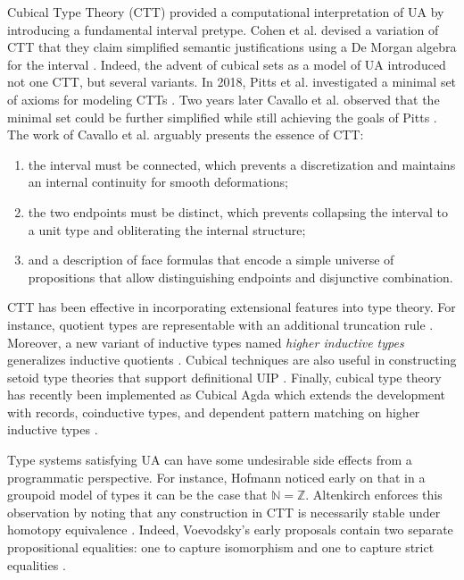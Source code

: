 Cubical Type Theory (CTT) provided a computational interpretation of UA by introducing a fundamental interval pretype.
Cohen et al. devised a variation of CTT that they claim simplified semantic justifications using a De Morgan algebra for the interval \cite{cohen2016}.
Indeed, the advent of cubical sets as a model of UA introduced not one CTT, but several variants.
In 2018, Pitts et al. investigated a minimal set of axioms for modeling CTTs \cite{pitts2018}.
Two years later Cavallo et al. observed that the minimal set could be further simplified while still achieving the goals of Pitts \cite{cavallo2020}.
The work of Cavallo et al. arguably presents the essence of CTT:
\begin{enumerate}
    \item {
        the interval must be connected, which prevents a discretization and maintains an internal continuity for smooth deformations;
    }
    \item {
        the two endpoints must be distinct, which prevents collapsing the interval to a unit type and obliterating the internal structure;
    }
    \item {
        and a description of face formulas that encode a simple universe of propositions that allow distinguishing endpoints and disjunctive combination.
    }
\end{enumerate}
CTT has been effective in incorporating extensional features into type theory.
For instance, quotient types are representable with an additional truncation rule \cite{kraus2020}.
Moreover, a new variant of inductive types named \textit{higher inductive types} generalizes inductive quotients \cite{angiuli2017}.
Cubical techniques are also useful in constructing setoid type theories that support definitional UIP \cite{sterling2020}.
Finally, cubical type theory has recently been implemented as Cubical Agda which extends the development with records, coinductive types, and dependent pattern matching on higher inductive types \cite{vezzosi2021}.

Type systems satisfying UA can have some undesirable side effects from a programmatic perspective.
For instance, Hofmann noticed early on that in a groupoid model of types it can be the case that $\mathbb{N} = \mathbb{Z}$.
Altenkirch enforces this observation by noting that any construction in CTT is necessarily stable under homotopy equivalence \cite{altenkirch2016}.
Indeed, Voevodsky's early proposals contain two separate propositional equalities: one to capture isomorphism and one to capture strict equalities \cite{voevodsky2013}.

